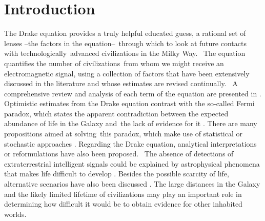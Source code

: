 \documentclass[crop]{CSLB}
\begin{document}
\maketitle


\section{Introduction}\label{S_motivations}

The Drake equation  \citep{drake_intelligent_1962} provides a truly
helpful educated guess, a rational set of lenses --the factors in the
equation-- through which to look at future contacts with
technologically advanced civilizations in the Milky Way. 
%
The equation quantifies the number of civilizations from whom we might
receive an electromagnetic signal, using a collection of factors that
have been extensively discussed in the literature and whose estimates
are revised continually. 
%
A comprehensive review and analysis of each term of the equation are
presented in \citet{vakoch_drake_2015}.
%
Optimistic estimates from the Drake equation contrast with the
so-called Fermi paradox, which states the apparent contradiction between the
expected abundance of life in the Galaxy and the lack of evidence for
it \citep[e.g. ][]{hart_explanation_1975, brin_great_1983,
barlow_galactic_2012, forgan_galactic_2016, anchordoqui_is_2017,
Sotos_biotechnology_2019, carroll_nellemback_fermi_2019}.
%
There are many propositions aimed at solving this paradox, which make
use of statistical \citep{solomonides_probabilistic_2016, horvat_calculating_2007,
maccone_statistical_2015} or stochastic approaches
\citep{forgan_numerical_2009, bloetscher_using_2019,
glade_stochastic_2011, forgan_numerical_2010}.
%
Regarding the Drake equation, analytical interpretations
\citep{prantzos_joint_2013, smith_broadcasting_2009} or reformulations
\citep[][and references therein]{burchell_whither_2006} have also been
proposed. 
%
The absence of detections of extraterrestrial intelligent signals
could be explained by
astrophysical phenomena that makes life difficult to develop
\citep{annis_astrophysical_1999}.
%
Besides the possible scarcity of life,
alternative scenarios have also been discussed
\citep{barlow_galactic_2013, lampton_information_2013,
conway_three_2018, forgan_galactic_2017}.
%
The large distances in the Galaxy and the likely limited lifetime of
civilizations may play an important role in determining how difficult it
would be to obtain evidence for other inhabited worlds.
\end{document}

